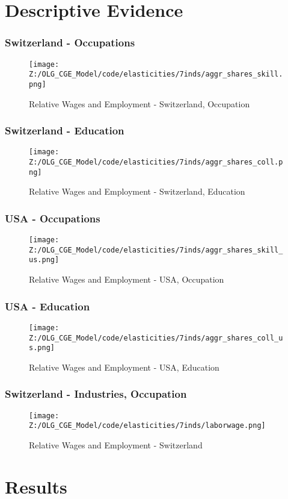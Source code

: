 \documentclass[11pt]{beamer} \usetheme{Frankfurt}
\begin{document}
\section{Descriptive Evidence}
\begin{frame}
  \frametitle{Switzerland - Occupations}
  \begin{figure}[ht]
    \centering
    \texttt{[image: Z:/OLG\_CGE\_Model/code/elasticities/7inds/aggr\_shares\_skill.png]}
    \caption{Relative Wages and Employment - Switzerland, Occupation}
  \end{figure}
\end{frame}
\begin{frame}
  \frametitle{Switzerland - Education}
  \begin{figure}[ht]
    \centering
    \texttt{[image: Z:/OLG\_CGE\_Model/code/elasticities/7inds/aggr\_shares\_coll.png]}
    \caption{Relative Wages and Employment - Switzerland, Education}
  \end{figure}
\end{frame}
\begin{frame}
  \frametitle{USA - Occupations}
  \begin{figure}[ht]
    \centering
    \texttt{[image: Z:/OLG\_CGE\_Model/code/elasticities/7inds/aggr\_shares\_skill\_us.png]}
    \caption{Relative Wages and Employment - USA, Occupation}
  \end{figure}
\end{frame}
\begin{frame}
  \frametitle{USA - Education}
  \begin{figure}[ht]
    \centering
    \texttt{[image: Z:/OLG\_CGE\_Model/code/elasticities/7inds/aggr\_shares\_coll\_us.png]}
    \caption{Relative Wages and Employment - USA, Education}
  \end{figure}
\end{frame}
\begin{frame}
  \frametitle{Switzerland - Industries, Occupation}
  \begin{figure}[ht]
    \centering
    \texttt{[image: Z:/OLG\_CGE\_Model/code/elasticities/7inds/laborwage.png]}
    \caption{Relative Wages and Employment - Switzerland}
  \end{figure}
\end{frame}



\section{Results}
\end{document}
